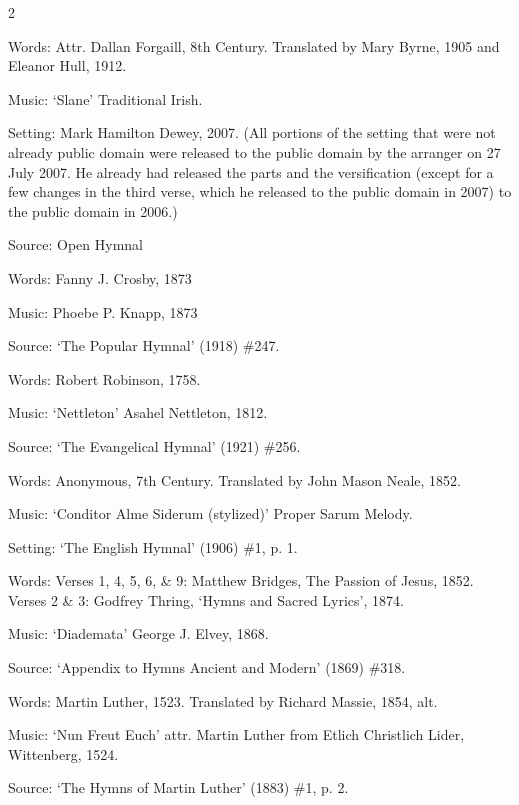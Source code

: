 \begin{multicols}{2}
\par\noindent
Words: Attr. Dallan Forgaill, 8th Century.  Translated by Mary Byrne, 1905 and Eleanor Hull, 1912. 
\par\noindent
Music: `Slane' Traditional Irish.
\par\noindent
Setting: Mark Hamilton Dewey, 2007. (All portions of the setting that were not already public domain were released to the public domain by the arranger on 27 July 2007. He already had released the parts and the versification (except for a few changes in the third verse, which he released to the public domain in 2007) to the public domain in 2006.)
\par\noindent
Source: Open Hymnal


\par\noindent
Words: Fanny J. Crosby, 1873
\par\noindent
Music: Phoebe P. Knapp, 1873
\par\noindent
Source: `The Popular Hymnal' (1918) \#247.


\par\noindent
Words: Robert Robinson, 1758.
\par\noindent
Music: `Nettleton' Asahel Nettleton, 1812. 
\par\noindent
Source: `The Evangelical Hymnal' (1921) \#256.


\par\noindent
Words: Anonymous, 7th Century. Translated by John Mason Neale, 1852.
\par\noindent
Music: `Conditor Alme Siderum (stylized)' Proper Sarum Melody.
\par\noindent
Setting: `The English Hymnal' (1906) \#1, p. 1.


\par\noindent
Words: Verses 1, 4, 5, 6, \& 9: Matthew Bridges, The Passion of Jesus, 1852. Verses 2 \& 3: Godfrey Thring, `Hymns and Sacred Lyrics', 1874.
\par\noindent
Music: `Diademata' George J. Elvey, 1868.
\par\noindent
Source: `Appendix to Hymns Ancient and Modern' (1869) \#318.


\par\noindent
Words: Martin Luther, 1523. Translated by Richard Massie, 1854, alt. 
\par\noindent
Music: `Nun Freut Euch' attr. Martin Luther from Etlich Christlich Lider, Wittenberg, 1524.
\par\noindent
Source: `The Hymns of Martin Luther' (1883) \#1, p. 2.



\end{multicols}
